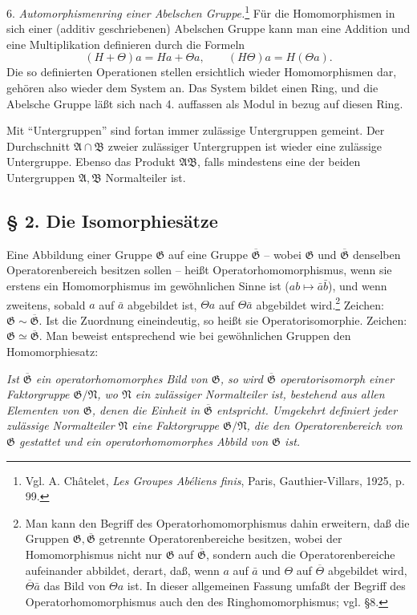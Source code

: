 \documentclass[11pt]{article}
\providecommand{\mG}{\mathfrak{G}}
\providecommand{\mA}{\mathfrak{A}}
\providecommand{\mB}{\mathfrak{B}}
\providecommand{\mN}{\mathfrak{N}}
\begin{document}
6. \emph{Automorphismenring einer Abelschen Gruppe.}\footnote{Vgl. A. Châtelet, \emph{Les Groupes Abéliens finis}, Paris, Gauthier-Villars, 1925, p. 99.} Für die Homomorphismen in sich einer (additiv geschriebenen) Abelschen Gruppe kann man eine Addition und eine Multiplikation definieren durch die Formeln
\[
        (H+\Theta)a=Ha+\Theta a,\qquad (H\Theta)a=H(\Theta a).
\]
Die so definierten Operationen stellen ersichtlich wieder Homomorphismen dar, gehören also wieder dem System an. Das System bildet einen Ring, und die Abelsche Gruppe läßt sich nach 4. auffassen als Modul in bezug auf diesen Ring.

Mit ``Untergruppen'' sind fortan immer zulässige Untergruppen gemeint. Der Durchschnitt $\mA\cap\mB$ zweier zulässiger Untergruppen ist wieder eine zulässige Untergruppe. Ebenso das Produkt $\mA\mB$, falls mindestens eine der beiden Untergruppen $\mA,\mB$ Normalteiler ist.

\subsection*{§ 2. Die Isomorphiesätze}

Eine Abbildung einer Gruppe $\mG$ auf eine Gruppe $\overline{\mG}$ -- wobei $\mG$ und $\overline{\mG}$ denselben Operatorenbereich besitzen sollen -- heißt Operatorhomomorphismus, wenn sie erstens ein Homomorphismus im gewöhnlichen Sinne ist ($ab\mapsto \bar a\bar b$), und wenn zweitens, sobald $a$ auf $\bar a$ abgebildet ist, $\Theta a$ auf $\Theta\bar a$ abgebildet wird.\footnote{Man kann den Begriff des Operatorhomomorphismus dahin erweitern, daß die Gruppen $\mG,\overline{\mG}$ getrennte Operatorenbereiche besitzen, wobei der Homomorphismus nicht nur $\mG$ auf $\overline{\mG}$, sondern auch die Operatorenbereiche aufeinander abbildet, derart, daß, wenn $a$ auf $\bar a$ und $\Theta$ auf $\overline\Theta$ abgebildet wird, $\overline\Theta\bar a$ das Bild von $\Theta a$ ist. In dieser allgemeinen Fassung umfaßt der Begriff des Operatorhomomorphismus auch den des Ringhomomorphismus; vgl. §8.} Zeichen: $\mG\sim\overline{\mG}$. Ist die Zuordnung eineindeutig, so heißt sie Operatorisomorphie. Zeichen: $\mG\simeq\overline{\mG}$. Man beweist entsprechend wie bei gewöhnlichen Gruppen den Homomorphiesatz:

\emph{Ist $\overline{\mG}$ ein operatorhomomorphes Bild von $\mG$, so wird $\overline{\mG}$ operatorisomorph einer Faktorgruppe $\mG/\mN$, wo $\mN$ ein zulässiger Normalteiler ist, bestehend aus allen Elementen von $\mG$, denen die Einheit in $\overline{\mG}$ entspricht. Umgekehrt definiert jeder zulässige Normalteiler $\mN$ eine Faktorgruppe $\mG/\mN$, die den Operatorenbereich von $\mG$ gestattet und ein operatorhomomorphes Abbild von $\mG$ ist.}
\end{document}
